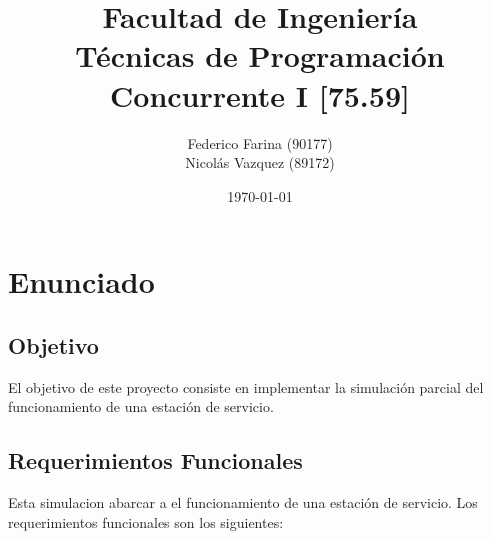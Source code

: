 \documentclass[12pt,a4paper,titlepage,oneside]{article}
\title{Facultad de Ingeniería\\Técnicas de Programación Concurrente I [75.59]}
\author{Federico Farina (90177) \\
Nicolás Vazquez (89172)}
\date{\today}
\begin{document}
    \fancyhead[LE]{\leftmark} 
    \fancyhead[RO]{\rightmark} 
    \renewcommand{\headrulewidth}{0.4pt} 
    \renewcommand{\footrulewidth}{0pt}

    \pagestyle{fancy}


 \maketitle
  \setcounter{page}{1}
  \tableofcontents

\newpage{}
\setcounter{page}{1}

\section{Enunciado}

\subsection{Objetivo}

El objetivo de este proyecto consiste en implementar la simulación parcial del funcionamiento de una estación de servicio.

\subsection{Requerimientos Funcionales}

Esta simulacion abarcar a el funcionamiento de una estación de servicio. Los requerimientos funcionales son los siguientes:
\end{document}
